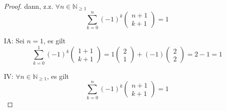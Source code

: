 \begin{proof}
dann, z.z. $\forall n\in\mathbb{N}_{\geq1}$
\begin{equation*}
\sum_{k=0}^{n}(-1)^k
\begin{pmatrix}
n+1 \\
k+1
\end{pmatrix}
=
1
\end{equation*}

IA: Sei $n=1$, es gilt
\begin{equation*}
\sum_{k=0}^{1}(-1)^k
\begin{pmatrix}
1+1 \\
k+1
\end{pmatrix}
=
1
\begin{pmatrix}
2 \\
1
\end{pmatrix}+
(-1)
\begin{pmatrix}
2 \\
2
\end{pmatrix}
=
2-1
=
1
\end{equation*}

IV: $\forall n\in\mathbb{N}_{\geq1}$, es gilt
\begin{equation*}
\sum_{k=0}^{n}(-1)^k
\begin{pmatrix}
n+1 \\
k+1
\end{pmatrix}
=
1
\end{equation*}


\end{proof}
